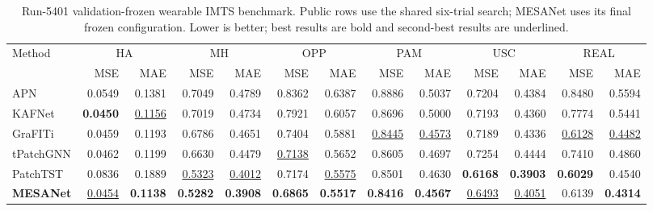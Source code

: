 \begin{table}[t]
\centering
\setlength{\tabcolsep}{2.35pt}
\caption{Run-5401 validation-frozen wearable IMTS benchmark. Public rows use
the shared six-trial search; MESANet uses its final frozen configuration.
Lower is better; best results are bold and second-best results are underlined.}
\label{tab:v665-main}
\begin{tabular}{@{}l*{12}{r}@{}}
\toprule
\multirow{2}{*}{Method} & \multicolumn{2}{c}{HA} & \multicolumn{2}{c}{MH}
& \multicolumn{2}{c}{OPP} & \multicolumn{2}{c}{PAM}
& \multicolumn{2}{c}{USC} & \multicolumn{2}{c}{REAL} \\
& MSE & MAE & MSE & MAE & MSE & MAE & MSE & MAE & MSE & MAE & MSE & MAE \\
\midrule
APN       & 0.0549 & 0.1381 & 0.7049 & 0.4789 & 0.8362 & 0.6387 & 0.8886 & 0.5037 & 0.7204 & 0.4384 & 0.8480 & 0.5594 \\
KAFNet    & \textbf{0.0450} & \underline{0.1156} & 0.7019 & 0.4734 & 0.7921 & 0.6057 & 0.8696 & 0.5000 & 0.7193 & 0.4360 & 0.7774 & 0.5441 \\
GraFITi   & 0.0459 & 0.1193 & 0.6786 & 0.4651 & 0.7404 & 0.5881 & \underline{0.8445} & \underline{0.4573} & 0.7189 & 0.4336 & \underline{0.6128} & \underline{0.4482} \\
tPatchGNN & 0.0462 & 0.1199 & 0.6630 & 0.4479 & \underline{0.7138} & 0.5652 & 0.8605 & 0.4697 & 0.7254 & 0.4444 & 0.7410 & 0.4860 \\
PatchTST  & 0.0836 & 0.1889 & \underline{0.5323} & \underline{0.4012} & 0.7174 & \underline{0.5575} & 0.8501 & 0.4630 & \textbf{0.6168} & \textbf{0.3903} & \textbf{0.6029} & 0.4540 \\
\textbf{MESANet} & \underline{0.0454} & \textbf{0.1138} & \textbf{0.5282} & \textbf{0.3908} & \textbf{0.6865} & \textbf{0.5517} & \textbf{0.8416} & \textbf{0.4567} & \underline{0.6493} & \underline{0.4051} & 0.6139 & \textbf{0.4314} \\
\bottomrule
\end{tabular}
\end{table}
